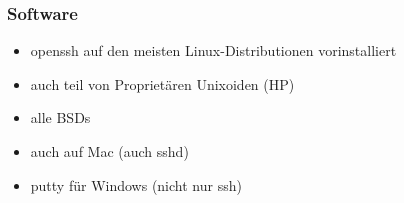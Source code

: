 \begin{frame}
\frametitle{Software}
\begin{itemize}
\item openssh auf den meisten Linux-Distributionen vorinstalliert
\pause
\item auch teil von Proprietären Unixoiden (HP)
\pause
\item alle BSDs
\pause
\item auch auf Mac (auch sshd)
\pause
\item putty für Windows (nicht nur ssh)
\end{itemize}
\end{frame}